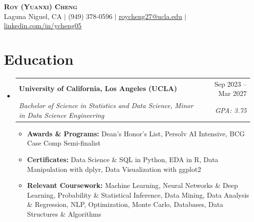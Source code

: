 \documentclass[letterpaper,11pt]{article}
\makeatletter
\newcommand{\resumeItem}[1]{
  \item\small{#1}
}
\newcommand{\resumeSubheading}[4]{
  \vspace{-2pt}\item
    \begin{tabular*}{\textwidth}[t]{l@{\extracolsep{\fill}}r}
      \textbf{#1} & #2 \\
      \textit{\small#3} & \textit{\small #4} \\
    \end{tabular*}\vspace{-7pt}
}
\newcommand{\resumeSubHeadingListStart}{\begin{itemize}[leftmargin=0in, label={}]}
\newcommand{\resumeSubHeadingListEnd}{\end{itemize}}
\newcommand{\resumeItemListStart}{\begin{itemize}[itemsep= 1.5pt, parsep=0pt]}
\newcommand{\resumeItemListEnd}{\end{itemize}\vspace{-5pt}}
\makeatother
\begin{document}
\begin{center}
    \textbf{\LARGE \scshape Roy (Yuanxi) Cheng} \\ \vspace{3pt}
    \small Laguna Niguel, CA $|$ (949) 378-0596 $|$
    \href{mailto:roycheng27@ucla.edu}{\underline{roycheng27@ucla.edu}} $|$
    \href{https://www.linkedin.com/in/ycheng05}{\underline{linkedin.com/in/ycheng05}}
\end{center}
\section{Education}
  \resumeSubHeadingListStart
    \resumeSubheading
      {University of California, Los Angeles (UCLA)}{Sep 2023 -- Mar 2027}
      {Bachelor of Science in Statistics and Data Science, Minor in Data Science Engineering}{GPA: 3.75}
      \resumeItemListStart
        \resumeItem{\textbf{Awards \& Programs:} Dean's Honor's List, Persolv AI Intensive, BCG Case Comp Semi-finalist}
        \resumeItem{\textbf{Certificates:} Data Science \& SQL in Python, EDA in R, Data Manipulation with dplyr, Data Visualization with ggplot2}
        \resumeItem{\textbf{Relevant Coursework:} Machine Learning, Neural Networks \& Deep Learning, Probability \& Statistical Inference, Data Mining, Data Analysis \& Regression, NLP, Optimization, Monte Carlo, Databases, Data Structures \& Algorithms}
      \resumeItemListEnd
  \resumeSubHeadingListEnd
\end{document}
